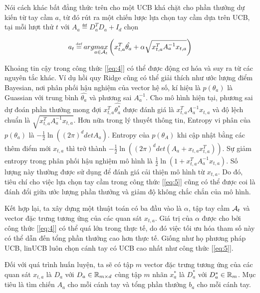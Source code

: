 \documentclass[14pt,oneside]{scrbook}
\begin{document}
Nói cách khác bất đẳng thức trên cho một UCB khá chặt cho phần thưởng dự
kiến từ tay cầm \(a\), từ đó rút ra một chiến lược lựa chọn tay cầm dựa
trên UCB, tại mỗi lượt thử \(t\) với \(A_a \eqdef D^T_aD_a+I_d\) chọn

\begin{equation}a_t\eqdef arg\underset{a\in\A_t}{max}\left(x^T_{t,a}\hat{\theta_a}+\alpha\sqrt{x^T_{t,a}A^{-1}_ax_{t,a}}\right)\label{eq:5}\end{equation}

Khoảng tin cậy trong công thức {[}\ref{eq:4}{]} có thể được động cơ hóa
và suy ra từ các nguyên tắc khác. Ví dụ hồi quy Ridge cũng có thể giải
thích như ước lượng điểm Bayesian, nơi phân phối hậu nghiệm của vector
hệ số, kí hiệu là \(p(\theta_a)\) là Guassian với trung bình
\(\hat{\theta_a}\) và phương sai \(A_a^{-1}\). Cho mô hình hiện tại,
phương sai dự đoán phần thưởng mong đợi \(x_{t,a}^T\hat{\theta^*_a}\)
được đánh giá là \(x_{t,a}^TA^{-1}_ax_{t,a}\) và độ lệch chuẩn là
\(\sqrt{x^T_{t,a}A^{-1}_a x_{t,a}}\). Hơn nữa trong lý thuyết thông tin,
Entropy vi phân của \(p(\theta_a)\) là
\(-\frac{1}{2}\ln(\left(2\pi\right)^ddetA_a)\). Entropy của
\(p(\theta_A)\) khi cập nhật bằng các thêm điểm mới \(x_{t,a}\) thì trở
thành
\(-\frac{1}{2}\ln(\left(2\pi\right)^ddet\left(A_a+x_{t,a}x^T_{t,a}\right))\).
Sự giảm entropy trong phân phối hậu nghiệm mô hình là
\(\frac{1}{2}\ln(1+x^T_{t,a}A^{-1}_a x_{t,a})\). Số lượng này thường
được sử dụng để đánh giá cải thiện mô hình từ \(x_{t,a}\). Do đó, tiêu
chí cho việc lựa chọn tay cầm trong công thức {[}\ref{eq:5}{]} cũng có
thể được coi là đánh đổi giữa ước lượng phần thưởng và giảm độ không
chắc chắn của mô hình.

Kết hợp lại, ta xây dựng một thuật toán có ba đầu vào là \(\alpha\), tập
tay cầm \(\mathcal{A}_t\) và vector đặc trưng tương ứng của các quan sát
\(x_{t,a}\). Giá trị của \(\alpha\) được cho bởi công thức
{[}\ref{eq:4}{]} có thể quá lớn trong thực tế, do đó việc tối ưu hóa
tham số này có thể dẫn đến tổng phần thưởng cao hơn thực tế. Giống như
họ phương pháp UCB, linUCB luôn chọn cánh tay có UCB cao nhất như công
thức {[}\ref{eq:5}{]}.

Đối với quá trình huấn luyện, ta sẽ có tập \(m\) vector đặc trưng tương
ứng của các quan sát \(x_{t,a}\) là \(D_a\) với
\(D_a \in \mathbb{R}_{m \times d}\) cùng tập \(m\) nhãn \(x^{*}_a\) là
\(D^{*}_a\) với \(D^{*}_a\in\mathbb{R}_m\). Mục tiêu là tìm chiến \(A_a\) cho
mỗi cánh tay và tổng phần thưởng \(b_a\) cho mỗi cánh tay.
\end{document}
